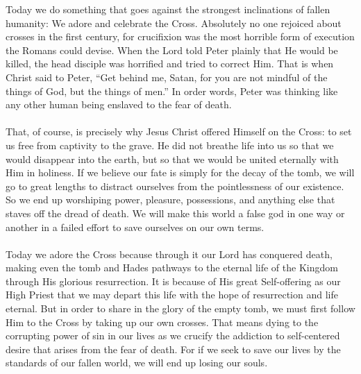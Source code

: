 \documentclass[twoside, letterpaper, 12pt]{report}
\begin{document}
\begin{maybetwocolumns}

Today we do something that goes against the strongest inclinations of fallen humanity:
We adore and celebrate the Cross. Absolutely no one rejoiced about crosses in the first century,
for crucifixion was the most horrible form of execution the Romans could devise. When the Lord
told Peter plainly that He would be killed, the head disciple was horrified and tried to correct Him.
That is when Christ said to Peter, “Get behind me, Satan, for you are not mindful of the things of
God, but the things of men.” In order words, Peter was thinking like any other human being
enslaved to the fear of death.\\\mbox{}\\

That, of course, is precisely why Jesus Christ offered Himself on the Cross: to set us free from
captivity to the grave. He did not breathe life into us so that we would disappear into the earth,
but so that we would be united eternally with Him in holiness. If we believe our fate is simply for
the decay of the tomb, we will go to great lengths to distract ourselves from the pointlessness of
our existence. So we end up worshiping power, pleasure, possessions, and anything else that staves
off the dread of death. We will make this world a false god in one way or another in a failed effort
to save ourselves on our own terms.\\\mbox{}\\

Today we adore the Cross because through it our Lord has conquered death, making even the tomb
and Hades pathways to the eternal life of the Kingdom through His glorious resurrection. It is
because of His great Self-offering as our High Priest that we may depart this life with the hope of
resurrection and life eternal. But in order to share in the glory of the empty tomb, we must first
follow Him to the Cross by taking up our own crosses. That means dying to the corrupting power
of sin in our lives as we crucify the addiction to self-centered desire that arises from the fear of
death. For if we seek to save our lives by the standards of our fallen world, we will end up losing
our souls.\\\mbox{}\\


\end{maybetwocolumns}
\end{document}
